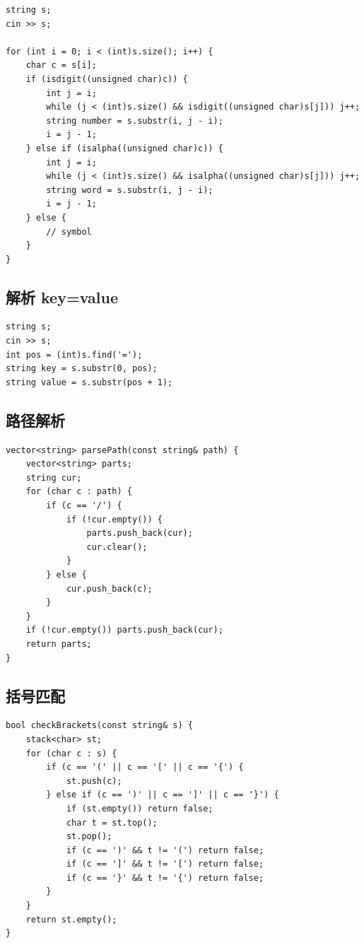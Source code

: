\begin{lstlisting}
string s;
cin >> s;

for (int i = 0; i < (int)s.size(); i++) {
    char c = s[i];
    if (isdigit((unsigned char)c)) {
        int j = i;
        while (j < (int)s.size() && isdigit((unsigned char)s[j])) j++;
        string number = s.substr(i, j - i);
        i = j - 1;
    } else if (isalpha((unsigned char)c)) {
        int j = i;
        while (j < (int)s.size() && isalpha((unsigned char)s[j])) j++;
        string word = s.substr(i, j - i);
        i = j - 1;
    } else {
        // symbol
    }
}
\end{lstlisting}

\subsection{解析 key=value}

\begin{lstlisting}
string s;
cin >> s;
int pos = (int)s.find('=');
string key = s.substr(0, pos);
string value = s.substr(pos + 1);
\end{lstlisting}

\subsection{路径解析}

\begin{lstlisting}
vector<string> parsePath(const string& path) {
    vector<string> parts;
    string cur;
    for (char c : path) {
        if (c == '/') {
            if (!cur.empty()) {
                parts.push_back(cur);
                cur.clear();
            }
        } else {
            cur.push_back(c);
        }
    }
    if (!cur.empty()) parts.push_back(cur);
    return parts;
}
\end{lstlisting}

\subsection{括号匹配}

\begin{lstlisting}
bool checkBrackets(const string& s) {
    stack<char> st;
    for (char c : s) {
        if (c == '(' || c == '[' || c == '{') {
            st.push(c);
        } else if (c == ')' || c == ']' || c == '}') {
            if (st.empty()) return false;
            char t = st.top();
            st.pop();
            if (c == ')' && t != '(') return false;
            if (c == ']' && t != '[') return false;
            if (c == '}' && t != '{') return false;
        }
    }
    return st.empty();
}
\end{lstlisting}

